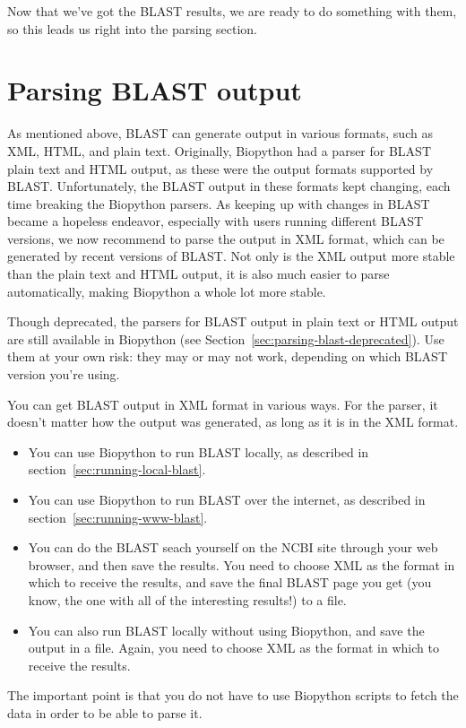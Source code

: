 \documentclass{report}
\begin{document}
Now that we've got the BLAST results, we are ready to do
something with them, so this leads us right into the parsing section.

\section{Parsing BLAST output}
\label{sec:parsing-blast}

As mentioned above, BLAST can generate output in various formats,
such as XML, HTML, and plain text. Originally, Biopython had a parser for
BLAST plain text and HTML output, as these were the output formats supported
by BLAST. Unfortunately, the BLAST output in these formats kept changing,
each time breaking the Biopython parsers. As keeping up with changes in BLAST
became a hopeless endeavor, especially with users running different BLAST
versions, we now recommend to parse the output in XML format, which can be
generated by recent versions of BLAST. Not only is the XML output more stable
than the plain text and HTML output, it is also much easier to parse
automatically, making Biopython a whole lot more stable.

Though deprecated, the parsers for BLAST output in plain text or HTML output
are still available in Biopython
(see Section~\ref{sec:parsing-blast-deprecated}).
Use them at your own risk: they may or may not work, depending on which BLAST
version you're using.

You can get BLAST output in XML format in various ways. For the parser, it
doesn't matter how the output was generated, as long as it is in the XML format.
\begin{itemize}
\item You can use Biopython to run BLAST locally, as described in
section~\ref{sec:running-local-blast}.
\item You can use Biopython to run BLAST over the internet, as described in
section~\ref{sec:running-www-blast}.
\item You can do the BLAST seach yourself on the NCBI site through your
web browser, and then save the results. You need to choose XML as the format
in which to receive the results, and save the final BLAST page you get
(you know, the one with all of the interesting results!) to a file.
\item You can also run BLAST locally without using Biopython, and save
the output in a file. Again, you need to choose XML as the format in which
to receive the results.
\end{itemize}
The important point is that you do not have to use Biopython
scripts to fetch the data in order to be able to parse it.
\end{document}
